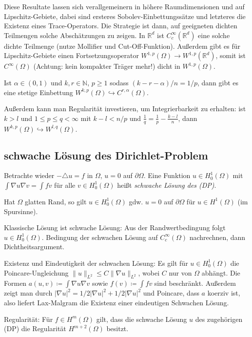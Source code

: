 \documentclass[11pt,a4paper]{scrartcl}
\newcommand{\N}{\mathbb{N}} %
\newcommand{\R}{\mathbb{R}} %
\newcommand{\norm}[1]{\|#1\|}
\newcommand{\laplace}{\triangle}
\theoremstyle{plain}
\theoremstyle{definition}
\theoremstyle{remark}
\begin{document}
Diese Resultate lassen sich verallgemeinern in höhere Raumdimensionen und auf Lipschitz-Gebiete, dabei sind ersteres Sobolev-Einbettungssätze und letzteres die Existenz eines Trace-Operators. Die Strategie ist dann, auf geeigneten dichten Teilmengen solche Abschätzungen zu zeigen. In $\R^d$ ist $C_c^\infty(\R^d)$ eine solche dichte Teilmenge (nutze Mollifier und Cut-Off-Funktion). Außerdem gibt es für Lipschitz-Gebiete einen Fortsetzungsoperator $W^{1,p}(\Omega) \to W^{1,p}(\R^d)$, somit ist $C^\infty(\Omega)$ (Achtung: kein kompakter Träger mehr!) dicht in $W^{1,p}(\Omega)$.

Ist $\alpha\in (0,1)$ und $k,r \in \N$, $p\geq 1$ sodass $(k-r-\alpha)/n=1/p$, dann gibt es eine stetige Einbettung $W^{k,p}(\Omega) \hookrightarrow C^{r,\alpha}(\Omega)$.

Außerdem kann man Regularität investieren, um Integrierbarkeit zu erhalten: ist $k>l$ und $1\leq p \leq q < \infty$ mit $k-l < n/p$ und $\frac{1}{q}=\frac{1}{p}-\frac{k-l}{n}$, dann $W^{k,p}(\Omega) \hookrightarrow W^{l,q}(\Omega)$.

\subsection{schwache Lösung des Dirichlet-Problem}

Betrachte wieder $-\laplace u = f$ in $\Omega$, $u=0$ auf $\partial\Omega$. Eine Funktion $u\in H^1_0(\Omega)$ mit $\int \nabla u \nabla v = \int fv$ für alle $v\in H^1_0(\Omega)$ heißt \emph{schwache Lösung des (DP)}. 

Hat $\Omega$ glatten Rand, so gilt $u\in H^1_0(\Omega)$ gdw. $u=0$ auf $\partial\Omega$ für $u\in H^1(\Omega)$ (im Spursinne).

Klassische Lösung ist schwache Lösung: Aus der Randwertbedingung folgt $u\in H^1_0(\Omega)$. Bedingung der schwachen Lösung auf $C_c^\infty(\Omega)$ nachrechnen, dann Dichtheitsargument.

Existenz und Eindeutigkeit der schwachen Lösung: Es gilt für $u\in H^1_0(\Omega)$ die Poincare-Ungleichung $\norm{u}_{L^2} \leq C \norm{\nabla u}_{L^2}$, wobei $C$ nur von $\Omega$ abhängt. Die Formen $a(u,v)\coloneqq \int \nabla u \nabla v$ sowie $f(v)\coloneqq \int fv$ sind beschränkt. Außerdem zeigt man durch $|\nabla u|^2 = 1/2|\nabla u|^2 + 1/2|\nabla u|^2$ und Poincare, dass $a$ koerziv ist, also liefert Lax-Malgram die Existenz einer eindeutigen Schwachen Lösung.

Regularität: Für $f\in H^m(\Omega)$ gilt, dass die schwache Lösung $u$ des zugehörigen (DP) die Regularität $H^{m+2}(\Omega)$ besitzt.
\end{document}
